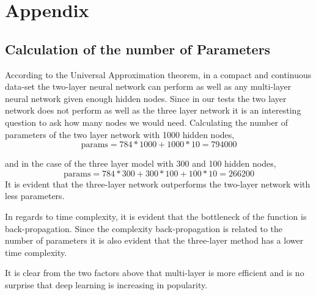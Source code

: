 \documentclass[12pt, twocolumn]{article}
\begin{document}


\section{Appendix}
\subsection{Calculation of the number of Parameters}
According to the Universal Approximation theorem, in a compact and continuous data-set the two-layer neural network can perform as well as any multi-layer neural network given enough hidden nodes. Since in our tests the two layer network does not perform as well as the three layer network it is an interesting question to ask how many nodes we would need. Calculating the number of parameters of the two layer network with 1000 hidden nodes, 
\begin{equation*}
\textrm{params} = 784*1000 + 1000* 10 = 794000
\end{equation*}

and in the case of the three layer model with 300 and 100 hidden nodes,
\begin{equation*}
\textrm{params} = 784*300 + 300*100 + 100* 10 = 266200
\end{equation*}
It is evident that the three-layer network outperforms the two-layer network with less parameters. 

In regards to time complexity, it is evident that the bottleneck of the function is back-propagation. Since the complexity back-propagation is related to the number of parameters it is also evident that the three-layer method has a lower time complexity.

It is clear from the two factors above that multi-layer is more efficient and is no surprise that deep learning is increasing in popularity.
\end{document}
